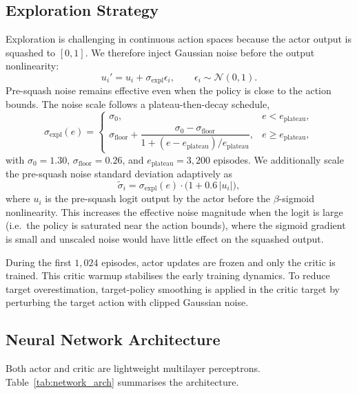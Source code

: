 \documentclass[a4paper,fleqn]{cas-dc}
\begin{document}
\subsection{Exploration Strategy}
\label{sec:exploration}

Exploration is challenging in continuous action spaces because the actor output is squashed to $[0,1]$. We therefore inject Gaussian noise before the output nonlinearity:
\[
u_i' = u_i + \sigma_{\mathrm{expl}} \epsilon_i,
\qquad
\epsilon_i \sim \mathcal{N}(0,1).
\]
Pre-squash noise remains effective even when the policy is close to the action bounds. The noise scale follows a plateau-then-decay schedule,
\[
\sigma_{\mathrm{expl}}(e) =
\begin{cases}
\sigma_0, & e < e_{\mathrm{plateau}}, \\[0.3em]
\sigma_{\mathrm{floor}} +
\dfrac{\sigma_0 - \sigma_{\mathrm{floor}}}
{1 + (e-e_{\mathrm{plateau}})/e_{\mathrm{plateau}}},
& e \ge e_{\mathrm{plateau}},
\end{cases}
\]
with $\sigma_0 = 1.30$, $\sigma_{\mathrm{floor}} = 0.26$, and $e_{\mathrm{plateau}} = 3{,}200$ episodes. %
We additionally scale the pre-squash noise standard deviation adaptively as
\[
\tilde\sigma_i = \sigma_{\mathrm{expl}}(e) \cdot \bigl(1 + 0.6\,|u_i|\bigr),
\]
where $u_i$ is the pre-squash logit output by the actor before the $\beta$-sigmoid nonlinearity.
This increases the effective noise magnitude when the logit is large (i.e.\ the policy is saturated near the action bounds), where the sigmoid gradient is small and unscaled noise would have little effect on the squashed output.

During the first $1{,}024$ episodes, actor updates are frozen and only the critic is trained. This critic warmup stabilises the early training dynamics. To reduce target overestimation, target-policy smoothing is applied in the critic target by perturbing the target action with clipped Gaussian noise.

\subsection{Neural Network Architecture}
\label{sec:architecture}

Both actor and critic are lightweight multilayer perceptrons. Table~\ref{tab:network_arch} summarises the architecture.
\end{document}
